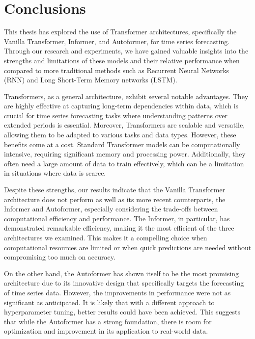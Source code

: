\chapter{Conclusions}
\pagestyle{esitscCD}

This thesis has explored the use of Transformer architectures, specifically the Vanilla Transformer, Informer, and Autoformer, for time series forecasting. Through our research and experiments, we have gained valuable insights into the strengths and limitations of these models and their relative performance when compared to more traditional methods such as Recurrent Neural Networks (RNN) and Long Short-Term Memory networks (LSTM).

Transformers, as a general architecture, exhibit several notable advantages. They are highly effective at capturing long-term dependencies within data, which is crucial for time series forecasting tasks where understanding patterns over extended periods is essential. Moreover, Transformers are scalable and versatile, allowing them to be adapted to various tasks and data types. However, these benefits come at a cost. Standard Transformer models can be computationally intensive, requiring significant memory and processing power. Additionally, they often need a large amount of data to train effectively, which can be a limitation in situations where data is scarce.

Despite these strengths, our results indicate that the Vanilla Transformer architecture does not perform as well as its more recent counterparts, the Informer and Autoformer, especially considering the trade-offs between computational efficiency and performance. The Informer, in particular, has demonstrated remarkable efficiency, making it the most efficient of the three architectures we examined. This makes it a compelling choice when computational resources are limited or when quick predictions are needed without compromising too much on accuracy.

On the other hand, the Autoformer has shown itself to be the most promising architecture due to its innovative design that specifically targets the forecasting of time series data. However, the improvements in performance were not as significant as anticipated. It is likely that with a different approach to hyperparameter tuning, better results could have been achieved. This suggests that while the Autoformer has a strong foundation, there is room for optimization and improvement in its application to real-world data.

